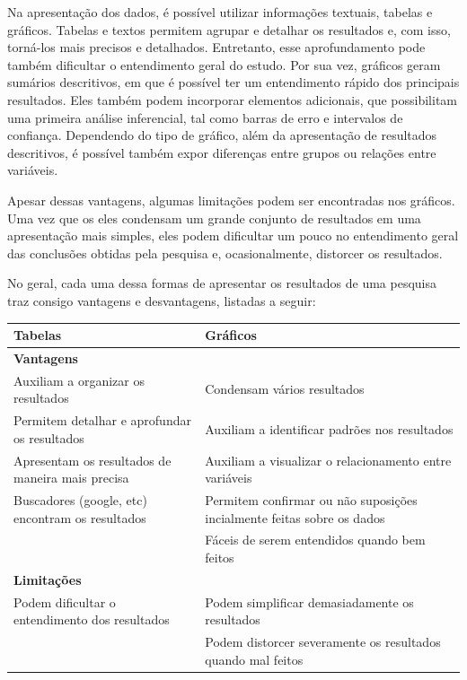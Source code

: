 \documentclass[
]{book}
\begin{document}
Na apresentação dos dados, é possível utilizar informações textuais, tabelas e gráficos. Tabelas e textos permitem agrupar e detalhar os resultados e, com isso, torná-los mais precisos e detalhados. Entretanto, esse aprofundamento pode também dificultar o entendimento geral do estudo. Por sua vez, gráficos geram sumários descritivos, em que é possível ter um entendimento rápido dos principais resultados. Eles também podem incorporar elementos adicionais, que possibilitam uma primeira análise inferencial, tal como barras de erro e intervalos de confiança. Dependendo do tipo de gráfico, além da apresentação de resultados descritivos, é possível também expor diferenças entre grupos ou relações entre variáveis.

Apesar dessas vantagens, algumas limitações podem ser encontradas nos gráficos. Uma vez que os eles condensam um grande conjunto de resultados em uma apresentação mais simples, eles podem dificultar um pouco no entendimento geral das conclusões obtidas pela pesquisa e, ocasionalmente, distorcer os resultados.

No geral, cada uma dessa formas de apresentar os resultados de uma pesquisa traz consigo vantagens e desvantagens, listadas a seguir:

\begin{longtable}[]{@{}
  >{\raggedright\arraybackslash}p{}
  >{\raggedright\arraybackslash}p{}@{}}
\toprule
Tabelas & Gráficos \\
\midrule
\endhead
\textbf{Vantagens} & \\
Auxiliam a organizar os resultados & Condensam vários resultados \\
Permitem detalhar e aprofundar os resultados & Auxiliam a identificar padrões nos resultados \\
Apresentam os resultados de maneira mais precisa & Auxiliam a visualizar o relacionamento entre variáveis \\
Buscadores (google, etc) encontram os resultados & Permitem confirmar ou não suposições incialmente feitas sobre os dados \\
& Fáceis de serem entendidos quando bem feitos \\
\textbf{Limitações} & \\
Podem dificultar o entendimento dos resultados & Podem simplificar demasiadamente os resultados \\
& Podem distorcer severamente os resultados quando mal feitos \\
\bottomrule
\end{longtable}
\end{document}
